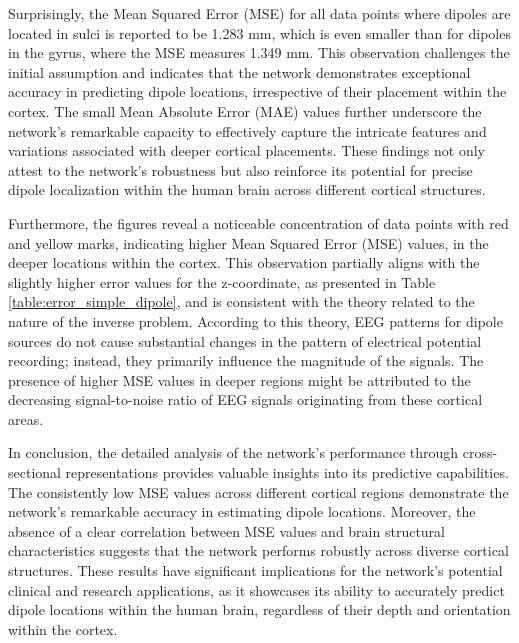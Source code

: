 \documentclass[a4paper, UKenglish, 11pt]{uiomaster}
\begin{document}
Surprisingly, the Mean Squared Error (MSE) for all data points where dipoles are located in sulci is reported to be 1.283 mm, which is even smaller than for dipoles in the gyrus, where the MSE measures 1.349 mm. This observation challenges the initial assumption and indicates that the network demonstrates exceptional accuracy in predicting dipole locations, irrespective of their placement within the cortex. The small Mean Absolute Error (MAE) values further underscore the network's remarkable capacity to effectively capture the intricate features and variations associated with deeper cortical placements. These findings not only attest to the network's robustness but also reinforce its potential for precise dipole localization within the human brain across different cortical structures.

Furthermore, the figures reveal a noticeable concentration of data points with red and yellow marks, indicating higher Mean Squared Error (MSE) values, in the deeper locations within the cortex. This observation partially aligns with the slightly higher error values for the z-coordinate, as presented in Table \ref{table:error_simple_dipole}, and is consistent with the theory related to the nature of the inverse problem. According to this theory, EEG patterns for dipole sources do not cause substantial changes in the pattern of electrical potential recording; instead, they primarily influence the magnitude of the signals. The presence of higher MSE values in deeper regions might be attributed to the decreasing signal-to-noise ratio of EEG signals originating from these cortical areas.

In conclusion, the detailed analysis of the network's performance through cross-sectional representations provides valuable insights into its predictive capabilities. The consistently low MSE values across different cortical regions demonstrate the network's remarkable accuracy in estimating dipole locations. Moreover, the absence of a clear correlation between MSE values and brain structural characteristics suggests that the network performs robustly across diverse cortical structures. These results have significant implications for the network's potential clinical and research applications, as it showcases its ability to accurately predict dipole locations within the human brain, regardless of their depth and orientation within the cortex.
\end{document}
